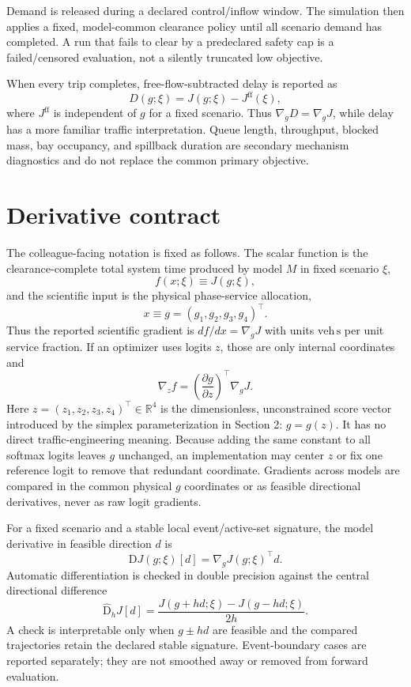 \documentclass[10pt]{article}
\newcommand{\veh}{\mathrm{veh}}
\newcommand{\secnd}{\mathrm{s}}
\newcommand{\R}{\mathbb{R}}
\begin{document}
Demand is released during a declared control/inflow window. The simulation then applies a fixed, model-common clearance policy until all scenario demand has completed. A run that fails to clear by a predeclared safety cap is a failed/censored evaluation, not a silently truncated low objective.

When every trip completes, free-flow-subtracted delay is reported as
\[
  D(g;\xi)=J(g;\xi)-J^{\mathrm{ff}}(\xi),
\]
where $J^{\mathrm{ff}}$ is independent of $g$ for a fixed scenario. Thus $\nabla_gD=\nabla_gJ$, while delay has a more familiar traffic interpretation. Queue length, throughput, blocked mass, bay occupancy, and spillback duration are secondary mechanism diagnostics and do not replace the common primary objective.

\section{Derivative contract}
The colleague-facing notation is fixed as follows. The scalar function is the clearance-complete total system time produced by model $M$ in fixed scenario $\xi$,
\[
   f(x;\xi) \equiv J(g;\xi),
\]
and the scientific input is the physical phase-service allocation,
\[
   x\equiv g=(g_1,g_2,g_3,g_4)^\top.
\]
Thus the reported scientific gradient is $df/dx=\nabla_gJ$ with units $\veh\,\secnd$ per unit service fraction. If an optimizer uses logits $z$, those are only internal coordinates and
\[
   \nabla_z f = \left(\frac{\partial g}{\partial z}\right)^\top \nabla_gJ.
\]
Here $z=(z_1,z_2,z_3,z_4)^\top\in\R^4$ is the dimensionless, unconstrained score vector introduced by the simplex parameterization in Section 2: $g=g(z)$. It has no direct traffic-engineering meaning. Because adding the same constant to all softmax logits leaves $g$ unchanged, an implementation may center $z$ or fix one reference logit to remove that redundant coordinate. Gradients across models are compared in the common physical $g$ coordinates or as feasible directional derivatives, never as raw logit gradients.

For a fixed scenario and a stable local event/active-set signature, the model derivative in feasible direction $d$ is
\[
  \mathrm{D}J(g;\xi)[d]=\nabla_gJ(g;\xi)^\top d.
\]
Automatic differentiation is checked in double precision against the central directional difference
\[
  \widehat{\mathrm{D}}_hJ[d]=
  \frac{J(g+hd;\xi)-J(g-hd;\xi)}{2h}.
\]
A check is interpretable only when $g\pm hd$ are feasible and the compared trajectories retain the declared stable signature. Event-boundary cases are reported separately; they are not smoothed away or removed from forward evaluation.
\end{document}
